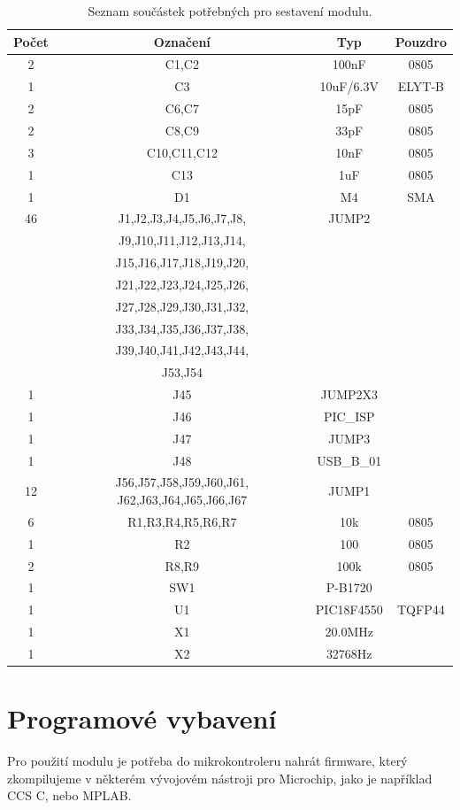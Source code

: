 \documentclass[12pt,a4paper,oneside]{article}
\begin{document}
\begin{savenotes}
\begin{table}[h!]
\begin{center}
\begin{tabular}{ |c|c|c|c| }
\hline 
Počet & Označení & Typ  & Pouzdro  \\ 
\hline 
2	&	C1,C2	&	100nF	&	0805	\\
1	&	C3	&	10uF/6.3V	&	ELYT-B	\\
2	&	C6,C7	&	15pF	&	0805	\\
2	&	C8,C9	&	33pF	&	0805	\\
3	&	C10,C11,C12	&	10nF	&	0805	\\
1	&	C13	&	1uF	&	0805	\\
1	&	D1	&	M4	&	SMA	\\
46	&	J1,J2,J3,J4,J5,J6,J7,J8,	&	JUMP2	&		\\
	&	J9,J10,J11,J12,J13,J14,	&		&		\\
	&	J15,J16,J17,J18,J19,J20,	&		&		\\
	&	J21,J22,J23,J24,J25,J26,	&		&		\\
	&	J27,J28,J29,J30,J31,J32,	&		&		\\
	&	J33,J34,J35,J36,J37,J38,	&		&		\\
	&	J39,J40,J41,J42,J43,J44,	&		&		\\
	&	J53,J54	&		&		\\
1	&	J45	&	JUMP2X3	&		\\
1	&	J46	&	PIC\_ISP	&		\\
1	&	J47	&	JUMP3	&		\\
1	&	J48	&	USB\_B\_01	&		\\
12	&	J56,J57,J58,J59,J60,J61, J62,J63,J64,J65,J66,J67	&	JUMP1	&		\\
6	&	R1,R3,R4,R5,R6,R7	&	10k	&	0805	\\
1	&	R2	&	100	&	0805	\\
2	&	R8,R9	&	100k	&	0805	\\
1	&	SW1	&	P-B1720	&		\\
1	&	U1	&	PIC18F4550	&	TQFP44	\\
1	&	X1	&	20.0MHz	&		\\
1	&	X2	&	32768Hz	&		\\
\hline 
\end{tabular}
\end{center}
\caption{Seznam součástek potřebných pro sestavení modulu.}
\label{seznam_soucastek}
\end{table}
\end{savenotes}

\newpage

\section{Programové vybavení}

Pro použití modulu je potřeba do mikrokontroleru nahrát firmware, který zkompilujeme v některém vývojovém nástroji pro Microchip, jako je například CCS C, nebo MPLAB.

\begin{thebibliography}{99}

\end{thebibliography}
\end{document}
